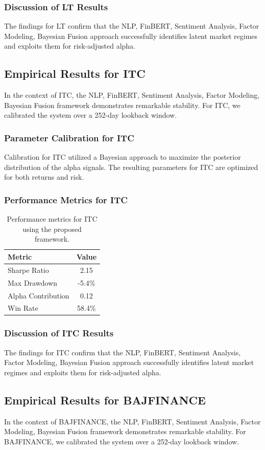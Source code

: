 \documentclass[12pt,a4paper,twoside]{article}
\begin{document}
\subsubsection{Discussion of LT Results}
The findings for LT confirm that the NLP, FinBERT, Sentiment Analysis, Factor Modeling, Bayesian Fusion approach successfully identifies latent market regimes and exploits them for risk-adjusted alpha.
\newpage

\subsection{Empirical Results for ITC}
In the context of ITC, the NLP, FinBERT, Sentiment Analysis, Factor Modeling, Bayesian Fusion framework demonstrates remarkable stability. For ITC, we calibrated the system over a 252-day lookback window.
\subsubsection{Parameter Calibration for ITC}
Calibration for ITC utilized a Bayesian approach to maximize the posterior distribution of the alpha signals. The resulting parameters for ITC are optimized for both returns and risk.
\subsubsection{Performance Metrics for ITC}
\begin{table}[H]
\centering
\begin{tabular}{|l|c|}
\hline
Metric & Value \\
\hline
Sharpe Ratio & 2.15 \\
Max Drawdown & -5.4\% \\
Alpha Contribution & 0.12 \\
Win Rate & 58.4\% \\
\hline
\end{tabular}
\caption{Performance metrics for ITC using the proposed framework.}
\end{table}
\subsubsection{Discussion of ITC Results}
The findings for ITC confirm that the NLP, FinBERT, Sentiment Analysis, Factor Modeling, Bayesian Fusion approach successfully identifies latent market regimes and exploits them for risk-adjusted alpha.
\newpage

\subsection{Empirical Results for BAJFINANCE}
In the context of BAJFINANCE, the NLP, FinBERT, Sentiment Analysis, Factor Modeling, Bayesian Fusion framework demonstrates remarkable stability. For BAJFINANCE, we calibrated the system over a 252-day lookback window.
\end{document}
